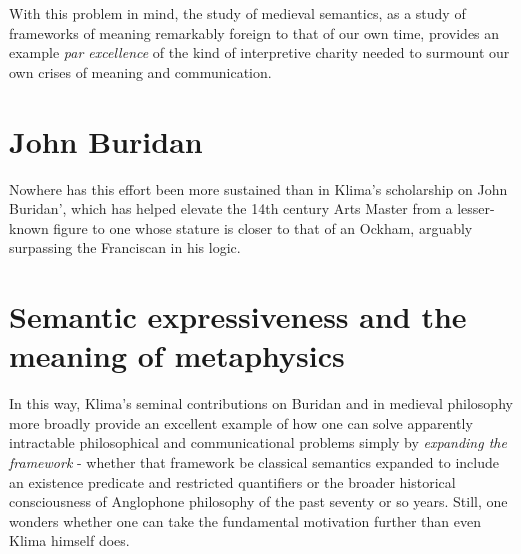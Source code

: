 \documentclass[]{article}
\begin{document}
With this problem in mind, 
the study of medieval semantics, 
as a study of frameworks of meaning remarkably foreign to that of our own time, 
provides an example \emph{par excellence} of the kind of interpretive charity needed to surmount our own crises of meaning and communication. 

\section{John Buridan}
Nowhere has this effort been more sustained than in Klima's scholarship on John Buridan', 
which has helped elevate the 14th century Arts Master from a lesser-known figure to one whose stature is closer to that of an Ockham, 
arguably surpassing the Franciscan in his logic.

\section{Semantic expressiveness and the meaning of metaphysics}
In this way, 
Klima's seminal contributions on Buridan and in medieval philosophy more broadly provide an excellent example of how one can solve apparently intractable philosophical and communicational problems 
simply by \emph{expanding the framework}
 - whether that framework be classical semantics expanded to include an existence predicate and restricted quantifiers
 or the broader historical consciousness of Anglophone philosophy of the past seventy or so years. 
Still, one wonders whether one can take the fundamental motivation further than even Klima himself does. 
\end{document}

